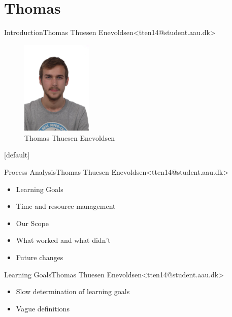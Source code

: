 \section{Thomas}


\begin{frame}{Introduction}{Thomas Thuesen Enevoldsen\newline<tten14@student.aau.dk>}
	\begin{figure}[h!]
    	\includegraphics[width=0.3\textwidth]{images/thomas.jpg}
    	\caption{Thomas Thuesen Enevoldsen}
		\centering    		
	\end{figure}
\end{frame}

[default]

\begin{frame}{Process Analysis}{Thomas Thuesen Enevoldsen\newline<tten14@student.aau.dk>}
  \begin{itemize}
  	\item Learning Goals
  	\item Time and resource management
  	\item Our Scope
  	\item What worked and what didn't
  	\item Future changes
  \end{itemize}
\end{frame}


\begin{frame}{Learning Goals}{Thomas Thuesen Enevoldsen\newline<tten14@student.aau.dk>}
    \begin{itemize}
  	\item<2-> Slow determination of learning goals 
  	\item<2-> Vague definitions 
  \end{itemize}
\end{frame}

